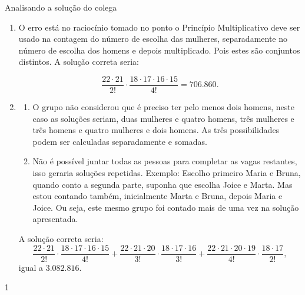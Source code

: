 \begin{answer}{Analisando a solução do colega}
{
\begin{enumerate}
\item O erro está no raciocínio tomado no ponto  o Princípio Multiplicativo deve ser usado na contagem do número de escolha das mulheres, separadamente no número de escolha dos homens e depois multiplicado. Pois estes são conjuntos distintos. A solução correta seria:
                    
$$\dfrac{22\cdot 21}{2!} \cdot \dfrac{ 18 \cdot 17 \cdot 16 \cdot 15}{4!}=706.860.$$
\item
\begin{enumerate}[label=\titem{\arabic*.}]
\item O grupo não considerou que é preciso ter pelo menos dois homens, neste caso as soluções seriam, duas mulheres e quatro homens, três mulheres e três homens e quatro mulheres e dois homens. As três possibilidades podem ser calculadas separadamente e somadas.  
\setcounter{enumii}{2}
\item Não é possível juntar todas as pessoas para completar as vagas restantes, isso geraria soluções repetidas. Exemplo: Escolho primeiro Maria e Bruna, quando conto a segunda parte, suponha que escolha Joice e Marta. Mas estou contando também, inicialmente Marta e Bruna, depois Maria e Joice. Ou seja, este mesmo grupo foi contado mais de uma vez na solução apresentada. 
\end{enumerate}
A solução correta seria:\small
$$\dfrac{22\cdot21 }{2!}\cdot \dfrac{18 \cdot 17 \cdot 16 \cdot 15}{4!}+\dfrac{22\cdot21\cdot 20 }{3!}\cdot \dfrac{18 \cdot 17\cdot 16}{3!}+\dfrac{22\cdot21\cdot 20 \cdot 19 }{4!}\cdot \dfrac{18 \cdot 17}{2!},$$
igual a $3.082.816.$
\end{enumerate}
}{1}
\end{answer}
\clearmargin

